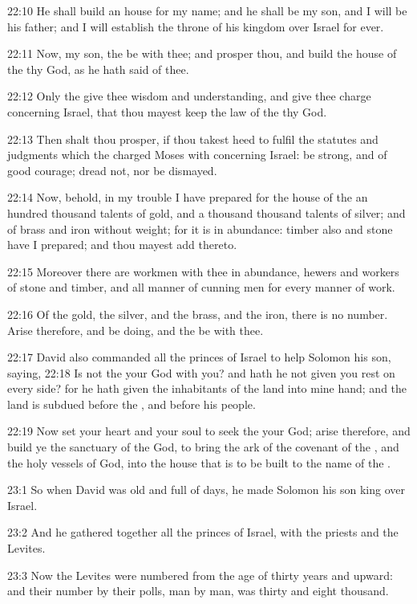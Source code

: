 22:10 He shall build an house for my name; and he shall be my son, and I will be his father; and I will establish the throne of his kingdom over Israel for ever.

22:11 Now, my son, the \LORD be with thee; and prosper thou, and build the house of the \LORD thy God, as he hath said of thee.

22:12 Only the \LORD give thee wisdom and understanding, and give thee charge concerning Israel, that thou mayest keep the law of the \LORD thy God.

22:13 Then shalt thou prosper, if thou takest heed to fulfil the statutes and judgments which the \LORD charged Moses with concerning Israel: be strong, and of good courage; dread not, nor be dismayed.

22:14 Now, behold, in my trouble I have prepared for the house of the \LORD an hundred thousand talents of gold, and a thousand thousand talents of silver; and of brass and iron without weight; for it is in abundance: timber also and stone have I prepared; and thou mayest add thereto.

22:15 Moreover there are workmen with thee in abundance, hewers and workers of stone and timber, and all manner of cunning men for every manner of work.

22:16 Of the gold, the silver, and the brass, and the iron, there is no number. Arise therefore, and be doing, and the \LORD be with thee.

22:17 David also commanded all the princes of Israel to help Solomon his son, saying, 22:18 Is not the \LORD your God with you? and hath he not given you rest on every side? for he hath given the inhabitants of the land into mine hand; and the land is subdued before the \LORD, and before his people.

22:19 Now set your heart and your soul to seek the \LORD your God; arise therefore, and build ye the sanctuary of the \LORD God, to bring the ark of the covenant of the \LORD, and the holy vessels of God, into the house that is to be built to the name of the \LORD.

23:1 So when David was old and full of days, he made Solomon his son king over Israel.

23:2 And he gathered together all the princes of Israel, with the priests and the Levites.

23:3 Now the Levites were numbered from the age of thirty years and upward: and their number by their polls, man by man, was thirty and eight thousand.

